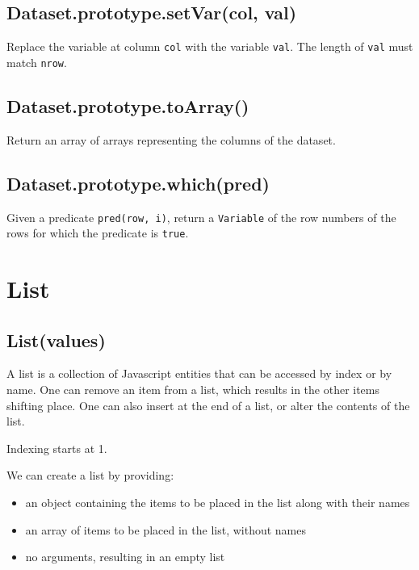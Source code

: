 \documentclass{article}
\begin{document}
    \subsection*{Dataset.prototype.setVar(col, val)}
    Replace the variable at column \texttt{col} with the variable \texttt{val}. The length
of \texttt{val} must match \texttt{nrow}.


    \subsection*{Dataset.prototype.toArray()}
    Return an array of arrays representing the columns of the dataset.


    \subsection*{Dataset.prototype.which(pred)}
    Given a predicate \texttt{pred(row, i)}, return a \texttt{Variable} of the row numbers of the
rows for which the predicate is \texttt{true}.


  \section{List}
    \subsection*{List(values)}
    A list is a collection of Javascript entities that can be accessed by index
or by name. One can remove an item from a list, which results in the other
items shifting place. One can also insert at the end of a list, or alter the
contents of the list.


Indexing starts at 1.


We can create a list by providing:


\begin{itemize}

\item an object containing the items to be placed in the list along with their names

\item an array of items to be placed in the list, without names

\item no arguments, resulting in an empty list

\end{itemize}
\end{document}
